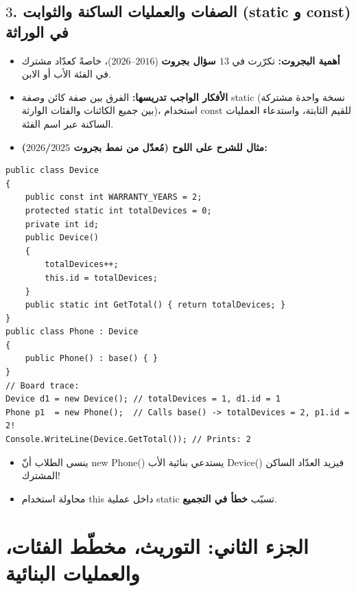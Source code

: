 \documentclass[14pt]{extarticle}
\begin{document}
\subsection*{$3$. الصفات والعمليات الساكنة والثوابت (\textenglish{static} و \textenglish{const}) في الوراثة}
\begin{itemize}[itemsep=0.25em]
    \item \textbf{أهمية البجروت:} تكرّرت في \textbf{$13$ سؤال بجروت} ($2016$--$2026$)، خاصةً كعدّاد مشترك في الفئة الأب أو الابن.
    \item \textbf{الأفكار الواجب تدريسها:} الفرق بين صفة كائن وصفة \textenglish{static} (نسخة واحدة مشتركة بين جميع الكائنات والفئات الوارثة)، استخدام \textenglish{const} للقيم الثابتة، واستدعاء العمليات الساكنة عبر اسم الفئة.
    \item \textbf{مثال للشرح على اللوح (مُعدّل من نمط بجروت $2025$/$2026$):}
\end{itemize}
\begin{boxCode}
\begin{english}
\begin{verbatim}
public class Device
{
    public const int WARRANTY_YEARS = 2;
    protected static int totalDevices = 0;
    private int id;
    public Device()
    {
        totalDevices++;
        this.id = totalDevices;
    }
    public static int GetTotal() { return totalDevices; }
}
public class Phone : Device
{
    public Phone() : base() { }
}
// Board trace:
Device d1 = new Device(); // totalDevices = 1, d1.id = 1
Phone p1  = new Phone();  // Calls base() -> totalDevices = 2, p1.id = 2!
Console.WriteLine(Device.GetTotal()); // Prints: 2
\end{verbatim}
\end{english}
\end{boxCode}
\begin{boxWarning}
\begin{itemize}
    \item ينسى الطلاب أنّ \textenglish{new Phone()} يستدعي بنائية الأب \textenglish{Device()} فيزيد العدّاد الساكن المشترك!
    \item محاولة استخدام \textenglish{this} داخل عملية \textenglish{static} تسبّب \textbf{خطأ في التجميع}.
\end{itemize}
\end{boxWarning}

\clearpage
\section*{الجزء الثاني: التوريث، مخطّط الفئات، والعمليات البنائية}
\end{document}
